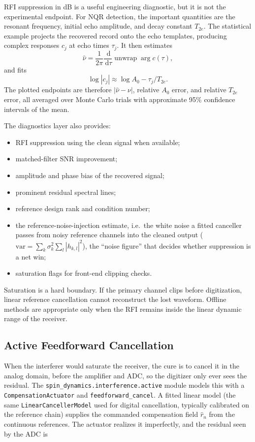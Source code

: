\documentclass[11pt,oneside]{report}
\newcommand{\code}[1]{\texttt{#1}}
\newcommand{\dd}{\,\mathrm{d}}
\begin{document}
RFI suppression in dB is a useful engineering diagnostic, but it is not the
experimental endpoint. For NQR detection, the important quantities are the
resonant frequency, initial echo amplitude, and decay constant \(T_{2e}\). The
statistical example projects the recovered record onto the echo templates,
producing complex responses \(c_j\) at echo times \(\tau_j\). It then estimates
\[
  \widehat{\nu}
  =
  \frac{1}{2\pi}\frac{\dd}{\dd\tau}
  \operatorname{unwrap}\arg c(\tau),
\]
and fits
\[
  \log |c_j|
  \approx
  \log A_0 - \tau_j/T_{2e}.
\]
The plotted endpoints are therefore
\(|\widehat{\nu}-\nu|\), relative \(A_0\) error, and relative \(T_{2e}\) error,
all averaged over Monte Carlo trials with approximate 95\% confidence
intervals of the mean.

The diagnostics layer also provides:
\begin{itemize}
  \item RFI suppression using the clean signal when available;
  \item matched-filter SNR improvement;
  \item amplitude and phase bias of the recovered signal;
  \item prominent residual spectral lines;
  \item reference design rank and condition number;
  \item the reference-noise-injection estimate, i.e.\ the white noise a fitted
  canceller passes from noisy reference channels into the cleaned output
  (\(\mathrm{var}=\sum_k \sigma_k^2 \sum_l |h_{k,l}|^2\)), the ``noise figure''
  that decides whether suppression is a net win;
  \item saturation flags for front-end clipping checks.
\end{itemize}

Saturation is a hard boundary. If the primary channel clips before digitization,
linear reference cancellation cannot reconstruct the lost waveform. Offline
methods are appropriate only when the RFI remains inside the linear dynamic
range of the receiver.

\subsection{Active Feedforward Cancellation}

When the interferer would saturate the receiver, the cure is to cancel it in the
analog domain, before the amplifier and ADC, so the digitizer only ever sees the
residual. The \code{spin\_dynamics.\allowbreak interference.\allowbreak active}
module models this with a \code{CompensationActuator} and \code{feedforward\_cancel}.
A fitted linear model (the same \code{LinearCancellerModel} used for digital
cancellation, typically calibrated on the reference chain) supplies the commanded
compensation field \(\widehat{r}_n\) from the continuous references. The actuator
realizes it imperfectly, and the residual seen by the ADC is
\end{document}
